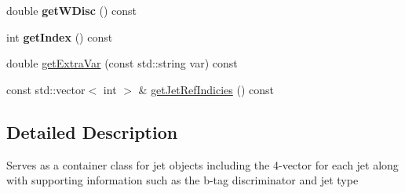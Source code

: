 \begin{DoxyCompactItemize}
\item 
\hypertarget{classConstituent_a9184e1d6ed1691f6efd0c5083444c021}{double {\bfseries get\-W\-Disc} () const }\label{classConstituent_a9184e1d6ed1691f6efd0c5083444c021}

\item 
\hypertarget{classConstituent_a64e38c0209bf5198477160ea690bbaf9}{int {\bfseries get\-Index} () const }\label{classConstituent_a64e38c0209bf5198477160ea690bbaf9}

\item 
double \hyperlink{classConstituent_a8fc04ce34e4e9c162f3d02f62f6b50cb}{get\-Extra\-Var} (const std\-::string var) const 
\item 
const std\-::vector$<$ int $>$ \& \hyperlink{classConstituent_aaa1bb377b75859b50c40feb217c98cb9}{get\-Jet\-Ref\-Indicies} () const 
\end{DoxyCompactItemize}


\subsection{Detailed Description}
Serves as a container class for jet objects including the 4-\/vector for each jet along with supporting information such as the b-\/tag discriminator and jet type 

